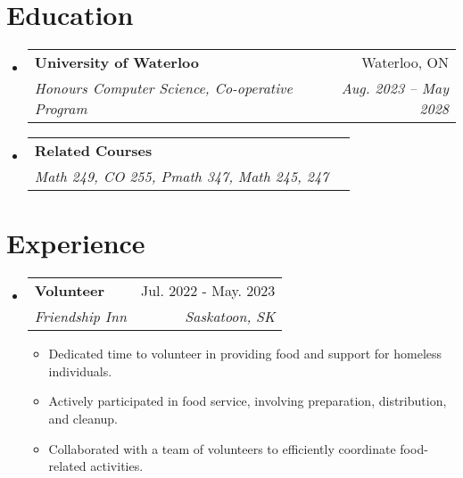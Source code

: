 \documentclass[letterpaper,11pt]{article}
\makeatletter
\newcommand{\resumeItem}[1]{
\item\small{
    {#1 \vspace{-2pt}}
}
}
\newcommand{\resumeSubheading}[4]{
\vspace{-2pt}\item
    \begin{tabular*}{0.97\textwidth}[t]{l@{\extracolsep{\fill}}r}
    \textbf{#1} & #2 \\
    \textit{\small#3} & \textit{\small #4} \\
    \end{tabular*}\vspace{-7pt}
}
\newcommand{\resumeSubSubheading}[2]{
    \item
    \begin{tabular*}{0.97\textwidth}{l@{\extracolsep{\fill}}r}
    \textit{\small#1} & \textit{\small #2} \\
    \end{tabular*}\vspace{-7pt}
}
\newcommand{\resumeSubHeadingListStart}{\begin{itemize}[leftmargin=0.3in, label={}]}
\newcommand{\resumeSubHeadingListEnd}{\end{itemize}}
\newcommand{\resumeItemListStart}{\begin{itemize}}
\newcommand{\resumeItemListEnd}{\end{itemize}\vspace{-5pt}}
\makeatother
\begin{document}
\section{Education}
\resumeSubHeadingListStart
    \resumeSubheading
    {University of Waterloo}{Waterloo, ON}
    {Honours Computer Science, Co-operative Program}{Aug. 2023 -- May 2028}
    \resumeSubheading
    {Related Courses}{}
    {Math 249, CO 255, Pmath 347, Math 245, 247}{}
\resumeSubHeadingListEnd


\section{Experience}
\resumeSubHeadingListStart

    \resumeSubheading
    {Volunteer}{Jul. 2022 - May. 2023}
    {Friendship Inn}{Saskatoon, SK}
    \resumeItemListStart
    \resumeItem{Dedicated time to volunteer in providing food and support for homeless individuals.}
    \resumeItem{Actively participated in food service, involving preparation, distribution, and cleanup.}
    \resumeItem{Collaborated with a team of volunteers to efficiently coordinate food-related activities.}
    \resumeItemListEnd
    



\resumeSubHeadingListEnd


\end{document}
